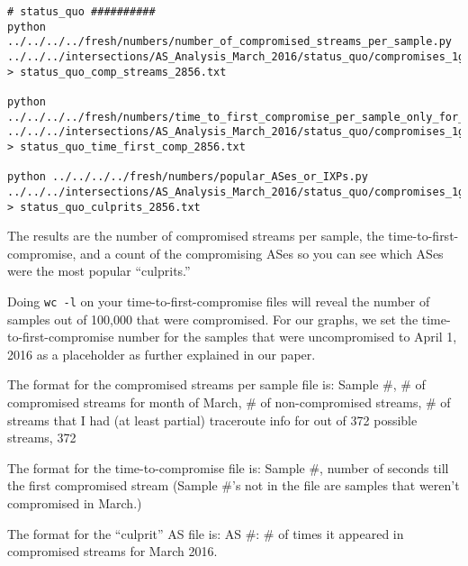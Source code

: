 \documentclass{article}
\begin{document}
\begin{lstlisting}
# status_quo ##########
python ../../../../fresh/numbers/number_of_compromised_streams_per_sample.py ../../../intersections/AS_Analysis_March_2016/status_quo/compromises_1guard_100K_2856.pickle > status_quo_comp_streams_2856.txt

python ../../../../fresh/numbers/time_to_first_compromise_per_sample_only_for_comp.py ../../../intersections/AS_Analysis_March_2016/status_quo/compromises_1guard_100K_2856.pickle > status_quo_time_first_comp_2856.txt

python ../../../../fresh/numbers/popular_ASes_or_IXPs.py ../../../intersections/AS_Analysis_March_2016/status_quo/compromises_1guard_100K_2856.pickle > status_quo_culprits_2856.txt
\end{lstlisting}

The results are
the number of compromised streams per sample, the time-to-first-compromise, and a count
of the compromising ASes so you can see which ASes were the most popular ``culprits.''

Doing {\tt wc -l} on your time-to-first-compromise files will reveal the number
of samples out of 100,000 that were compromised. For our graphs, we set the
time-to-first-compromise number for the samples that were uncompromised to
April 1, 2016 as a placeholder as further explained in our paper.

The format for the compromised streams per sample file is:
Sample \#, \# of compromised streams for month of March, \# of non-compromised streams, \# of streams
that I had (at least partial) traceroute info for out of 372 possible streams, 372

The format for the time-to-compromise file is:
Sample \#, number of seconds till the first compromised stream
(Sample \#'s not in the file are samples that weren't compromised in March.)

The format for the ``culprit'' AS file is:
AS \#: \# of times it appeared in compromised streams for March 2016.

\printbibliography
\end{document}
